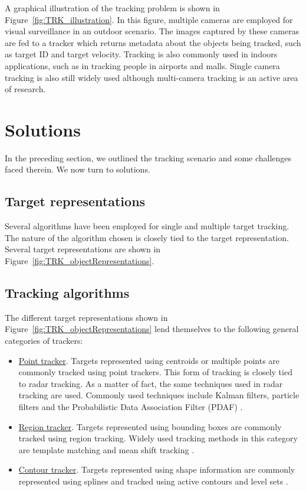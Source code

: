A graphical illustration of the tracking problem is shown in Figure~\ref{fig:TRK_illustration}.  In this figure, multiple cameras are employed for visual surveillance in an outdoor scenario.  The images captured by these cameras are fed to a tracker which returns metadata about the objects being tracked, such as target ID and target velocity.  Tracking is also commonly used in indoors applications, such as in tracking people in airports and malls.  Single camera tracking is also still widely used although multi-camera tracking is an active area of research.

\section{Solutions}
In the preceding section, we outlined the tracking scenario and some challenges faced therein.  We now turn to solutions.  

\subsection{Target representations}
Several algorithms have been employed for single and multiple target tracking.  The nature of the algorithm chosen is closely tied to the target representation.  Several target representations are shown in Figure~\ref{fig:TRK_objectRepresentations}.  

\subsection{Tracking algorithms}
The different target representations shown in Figure~\ref{fig:TRK_objectRepresentations} lend themselves to the following general categories of trackers:

\begin{itemize}
\item \underline{Point tracker}.  Targets represented using centroids or multiple points are commonly tracked using point trackers.  This form of tracking is closely tied to radar tracking.  As a matter of fact, the same techniques used in radar tracking are used.  Commonly used techniques include Kalman filters, particle filters and the Probabilistic Data Association Filter (PDAF) \cite{1983_JNL_JPDAF_Fortmann}.
\item \underline{Region tracker}.  Targets represented using bounding boxes are commonly tracked using region tracking.  Widely used tracking methods in this category are template matching and mean shift tracking \cite{2002_JNL_MeanShift_Comaniciu}.
\item \underline{Contour tracker}.  Targets represented using shape information are commonly represented using splines and tracked using active contours \cite{2000_BOOK_ActiveVision_Blake} and level sets \cite{1995_JNL_LevelSets_Malladi}.
\end{itemize}

